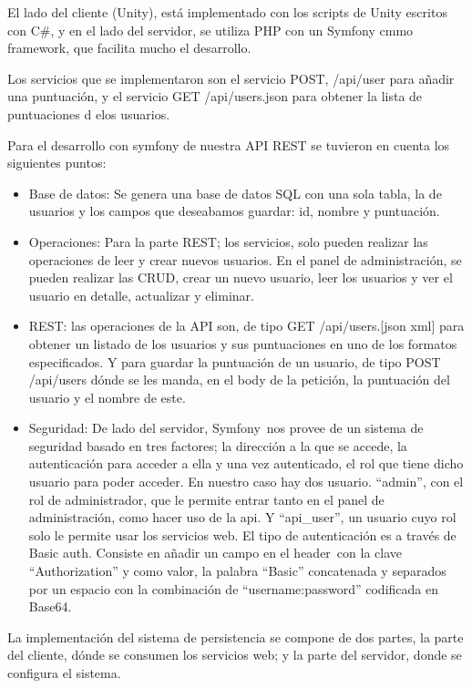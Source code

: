 El lado del cliente (Unity), está implementado con los scripts de Unity escritos con C#, y en el lado del servidor, se utiliza PHP con un Symfony cmmo framework, que facilita mucho el desarrollo.

Los servicios que se implementaron son el servicio POST, /api/user para añadir una puntuación, y el servicio GET /api/users.json para obtener la lista de puntuaciones d elos usuarios.

Para el desarrollo con symfony de nuestra API REST se tuvieron en cuenta los siguientes puntos:

\begin{itemize}
\item{Base de datos: Se genera una base de datos SQL con una sola tabla, la de usuarios y los campos que deseabamos guardar: id, nombre y puntuación.}

\item{Operaciones: Para la parte REST; los servicios, solo pueden realizar las operaciones de leer y crear nuevos usuarios. En el panel de administración, se pueden realizar las CRUD, crear un nuevo usuario, leer los usuarios y ver el usuario en detalle, actualizar y eliminar.}

\item{REST: las operaciones de la API son, de tipo GET /api/users.{[}json \textbar{} xml{]} para obtener un listado de los usuarios y sus puntuaciones en uno de los formatos especificados. Y para guardar la puntuación de un usuario, de tipo POST /api/users dónde se les manda, en el body de la petición, la puntuación del usuario y el nombre de este.}

\item{Seguridad: De lado del servidor, Symfony~nos provee de un sistema de seguridad basado en tres factores; la dirección a la que se accede, la autenticación para acceder a ella y una vez autenticado, el rol que tiene dicho usuario para poder acceder. En nuestro caso hay dos usuario. ``admin'', con el rol de administrador, que le permite entrar tanto en el panel de administración, como hacer uso de la api. Y ``api\_user'', un usuario cuyo rol solo le permite usar los servicios web. El tipo de autenticación es a través de Basic auth. Consiste en añadir un campo en el header~con la clave ``Authorization'' y como valor, la palabra ``Basic'' concatenada y separados por un espacio con la combinación de ``username:password'' codificada en Base64.}
\end{itemize}

La implementación del sistema de persistencia se compone de dos partes, la parte del cliente, dónde se consumen los servicios web; y la parte del servidor, donde se configura el sistema.


